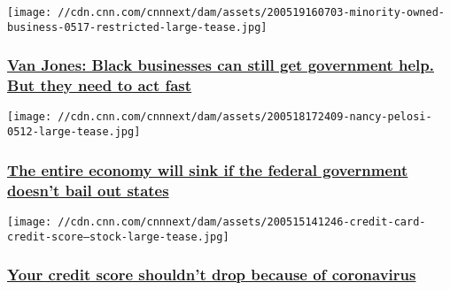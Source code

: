 \texttt{[image: //cdn.cnn.com/cnnnext/dam/assets/200519160703-minority-owned-business-0517-restricted-large-tease.jpg]}

\hypertarget{van-jones-black-businesses-can-still-get-government-help-but-they-need-to-act-fast}{%
\subsubsection{\texorpdfstring{\href{/2020/05/19/perspectives/minority-owned-businesses-ppp-loans/index.html}{Van
Jones: Black businesses can still get government help. But they need to
act
fast}}{Van Jones: Black businesses can still get government help. But they need to act fast}}\label{van-jones-black-businesses-can-still-get-government-help-but-they-need-to-act-fast}}

\href{/2020/05/19/perspectives/state-government-bailout/index.html}{}

\texttt{[image: //cdn.cnn.com/cnnnext/dam/assets/200518172409-nancy-pelosi-0512-large-tease.jpg]}

\hypertarget{the-entire-economy-will-sink-if-the-federal-government-doesnt-bail-out-states}{%
\subsubsection{\texorpdfstring{\href{/2020/05/19/perspectives/state-government-bailout/index.html}{The
entire economy will sink if the federal government doesn't bail out
states}}{The entire economy will sink if the federal government doesn't bail out states}}\label{the-entire-economy-will-sink-if-the-federal-government-doesnt-bail-out-states}}

\href{/2020/05/18/perspectives/credit-score-coronavirus/index.html}{}

\texttt{[image: //cdn.cnn.com/cnnnext/dam/assets/200515141246-credit-card-credit-score---stock-large-tease.jpg]}

\hypertarget{your-credit-score-shouldnt-drop-because-of-coronavirus}{%
\subsubsection{\texorpdfstring{\href{/2020/05/18/perspectives/credit-score-coronavirus/index.html}{Your
credit score shouldn't drop because of
coronavirus}}{Your credit score shouldn't drop because of coronavirus}}\label{your-credit-score-shouldnt-drop-because-of-coronavirus}}

\href{/2020/05/15/perspectives/ray-dalio-capitalism/index.html}{}

